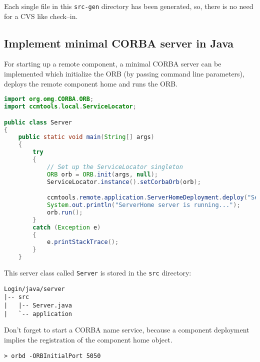 Each single file in this {\tt src-gen} directory has been generated, so, 
there is no need for a CVS like check--in.


\subsection{Implement minimal CORBA server in Java}
\label{subsection:ImplementMinimalCorbaServerJava}
For starting up a remote component, a minimal CORBA server can be implemented 
which initialize the ORB (by passing command line parameters), deploys the remote
component home and runs the ORB.

\begin{footnotesize}
\begin{lstlisting}[language=Java]
import org.omg.CORBA.ORB;
import ccmtools.local.ServiceLocator;

public class Server
{
    public static void main(String[] args)
    {
        try
        {
            // Set up the ServiceLocator singleton
            ORB orb = ORB.init(args, null);
            ServiceLocator.instance().setCorbaOrb(orb);

            ccmtools.remote.application.ServerHomeDeployment.deploy("ServerHome");
            System.out.println("ServerHome server is running...");
            orb.run();
        }
        catch (Exception e)
        {
            e.printStackTrace();
        }
    }
\end{lstlisting}
\end{footnotesize}

This server class called {\tt Server} is stored in the {\tt src} directory:
\begin{footnotesize}
\begin{verbatim}
Login/java/server
|-- src
|   |-- Server.java
|   `-- application
\end{verbatim}
\end{footnotesize}

Don't forget to start a CORBA name service, because a component deployment
implies the registration of the component home object.
\begin{footnotesize}
\begin{verbatim}
> orbd -ORBInitialPort 5050
\end{verbatim}
\end{footnotesize}

